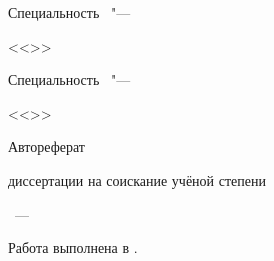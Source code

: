 \thispagestyle{empty}

\noindent%

\vspace{0pt plus1fill} %
\begin{center}
\textbf {\large \thesisAuthor}
\end{center}

\vspace{0pt plus3fill} %
\begin{center}
\textbf {\Large %
\thesisTitle}

\vspace{0pt plus3fill} %
{\large Специальность \thesisSpecialtyNumber\ "---\par <<\thesisSpecialtyTitle>>}

\ifdefined\thesisSpecialtyTwoNumber
{\large Специальность \thesisSpecialtyTwoNumber\ "---\par <<\thesisSpecialtyTwoTitle>>}
\fi

\vspace{0pt plus1.5fill} %
\Large{Автореферат}\par
\large{диссертации на соискание учёной степени\par \thesisDegree}
\end{center}

\vspace{0pt plus4fill} %
{\centering\thesisCity~--- \thesisYear\par}

\newpage
\thispagestyle{empty}
\noindent Работа выполнена в {\thesisInOrganization}.

